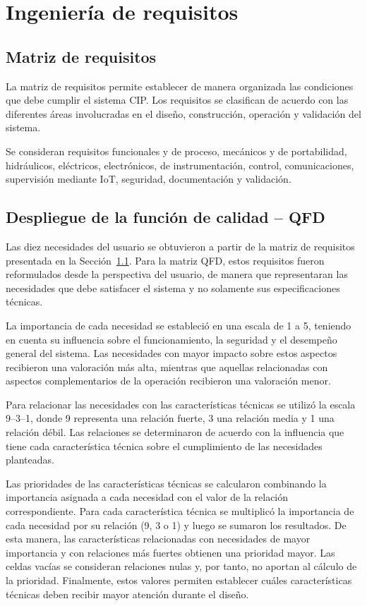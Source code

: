 \section{Ingeniería de requisitos}


\subsection{Matriz de requisitos}\label{sec:matriz_requisitos}



La matriz de requisitos permite establecer de manera organizada las condiciones que debe cumplir el sistema CIP. Los requisitos se clasifican de acuerdo con las diferentes áreas involucradas en el diseño, construcción, operación y validación del sistema.

Se consideran requisitos funcionales y de proceso, mecánicos y de portabilidad, hidráulicos, eléctricos, electrónicos, de instrumentación, control, comunicaciones, supervisión mediante IoT, seguridad, documentación y validación.

\subsection{Despliegue de la función de calidad -- QFD}

Las diez necesidades del usuario se obtuvieron a partir de la matriz de requisitos presentada en la Sección~\ref{sec:matriz_requisitos}. Para la matriz QFD, estos requisitos fueron reformulados desde la perspectiva del usuario, de manera que representaran las necesidades que debe satisfacer el sistema y no solamente sus especificaciones técnicas.

La importancia de cada necesidad se estableció en una escala de 1 a 5, teniendo en cuenta su influencia sobre el funcionamiento, la seguridad y el desempeño general del sistema. Las necesidades con mayor impacto sobre estos aspectos recibieron una valoración más alta, mientras que aquellas relacionadas con aspectos complementarios de la operación recibieron una valoración menor.

Para relacionar las necesidades con las características técnicas se utilizó la escala 9--3--1, donde 9 representa una relación fuerte, 3 una relación media y 1 una relación débil. Las relaciones se determinaron de acuerdo con la influencia que tiene cada característica técnica sobre el cumplimiento de las necesidades planteadas.

Las prioridades de las características técnicas se calcularon combinando la importancia asignada a cada necesidad con el valor de la relación correspondiente. Para cada característica técnica se multiplicó la importancia de cada necesidad por su relación (9, 3 o 1) y luego se sumaron los resultados. De esta manera, las características relacionadas con necesidades de mayor importancia y con relaciones más fuertes obtienen una prioridad mayor. Las celdas vacías se consideran relaciones nulas y, por tanto, no aportan al cálculo de la prioridad. Finalmente, estos valores permiten establecer cuáles características técnicas deben recibir mayor atención durante el diseño.

